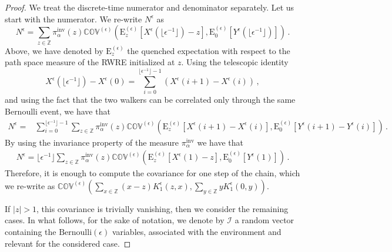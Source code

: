 \documentclass[10pt,a4paper]{amsart}
\begin{document}
\begin{proof} We treat the discrete-time numerator and denominator separately. 
	Let us start with the numerator. We re-write $N^{\epsilon}$ as
	\begin{equation}\label{N-epsilon}
		N^{\epsilon}=	\sum_{z\in \mathbb{Z}}\pi^{\text{inv}}_{\alpha}(z)\mathbb{COV}^{(\epsilon)}\left(\mathrm{E}_{z}^{(\epsilon)}\left[X^{\epsilon}(\lfloor \epsilon^{-1}\rfloor)-z\right],\mathrm{E}_{0}^{(\epsilon)}[Y^{\epsilon}(\lfloor \epsilon^{-1}\rfloor)]\right)\,.
	\end{equation}
		Above, we have denoted by $\mathrm{E}^{(\epsilon)}_{z}$ the quenched expectation with respect to the path space measure of the RWRE initialized at $z$. 
			Using the telescopic identity 
		\begin{equation}\label{telescopic}
			X^{\epsilon}(\lfloor\epsilon^{-1}\rfloor)-X^{\epsilon}(0)=\sum_{i=0}^{\lfloor\epsilon^{-1}\rfloor-1}\left(X^{\epsilon}(i+1)-X^{\epsilon}(i)\right)\,,
		\end{equation}
		and using the fact that the two walkers can be correlated only through the same Bernoulli event, we have that 
		\begin{equation*}
			\begin{split}
				N^{\epsilon}=&
				\sum_{i=0}^{\lfloor\epsilon^{-1}\rfloor-1}\sum_{z\in \mathbb{Z}}\pi^{\text{inv}}_{\alpha}(z)\mathbb{COV}^{(\epsilon)}\left(\mathrm{E}_{z}^{(\epsilon)}\left[X^{\epsilon}(i+1)-X^{\epsilon}( i)\right],\mathrm{E}_{0}^{(\epsilon)}\left[Y^{\epsilon}(i+1)-Y^{\epsilon}( i)\right]\right)\,.
			\end{split}
		\end{equation*}
		By using the invariance property of the measure $\pi^{\text{inv}}_{\alpha}$ we have that 
		\begin{equation*}
			\begin{split}
				N^{\epsilon}=
				\lfloor\epsilon^{-1}\rfloor\sum_{z\in \mathbb{Z}}\pi^{\text{inv}}_{\alpha}(z)\mathbb{COV}^{(\epsilon)}\left(\mathrm{E}_{z}^{(\epsilon)}\left[X^{\epsilon}(1)-z\right],\mathrm{E}_{0}^{(\epsilon)}\left[Y^{\epsilon}(1)\right]\right)\,.
			\end{split}
		\end{equation*}
		Therefore, it is enough to compute the covariance for one step of the chain, which we re-write as $\mathbb{COV}^{(\epsilon)}\left(\sum_{x\in \mathbb{Z}}(x-z)K_{1}^{\epsilon}(z,x),\sum_{y\in \mathbb{Z}}yK_{1}^{\epsilon}(0,y)\right)$. 

	If $|z|>1$, this covariance is trivially vanishing, then we consider the remaining cases. 
In what follows, for the sake of notation, we denote by $\bm{\mathcal{I}}$ a random vector containing the $\text{Bernoulli}(\epsilon)$ variables, associated with the environment and relevant for the considered case. 



\end{proof}
\end{document}
